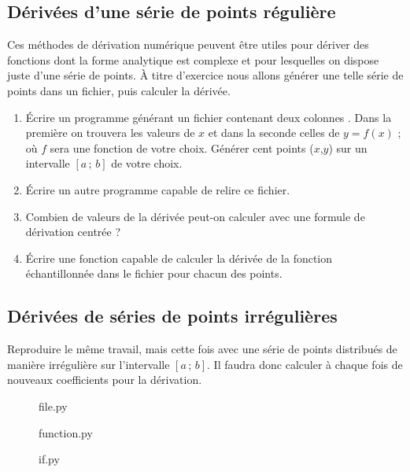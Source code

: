 \subsection{Dérivées d'une série de points régulière \sc{[Facultatif]}}

Ces méthodes de dérivation numérique  peuvent être utiles pour dériver
des fonctions dont la forme analytique est complexe et pour lesquelles
on dispose juste d'une série de points. À titre d'exercice nous allons
générer une  telle série de points  dans un fichier, puis  calculer la
dérivée.

\begin{enumerate}
\item Écrire un programme générant  un fichier contenant deux colonnes
  . Dans  la première  on trouvera les  valeurs de  $x$ et
  dans la seconde celles de $y=f(x)$ ; où $f$ sera une fonction de votre
  choix. Générer  cent points ($x$,$y$) sur un  intervalle $[a\,;\,b]$  de votre
  choix.
\item Écrire un autre programme capable de relire ce fichier.
\item  Combien de  valeurs de  la  dérivée peut-on  calculer avec  une
  formule de dérivation centrée ?
\item  Écrire  une fonction  capable  de  calculer  la dérivée  de  la
  fonction échantillonnée dans le fichier pour chacun des points.
\end{enumerate}

\subsection{Dérivées de séries de points irrégulières \sc{[Facultatif]}}

Reproduire le même  travail, mais cette fois avec une  série de points
distribués  de manière  irrégulière sur  l'intervalle $[a\,;\,b]$.  Il
faudra donc  calculer à chaque  fois de nouveaux coefficients  pour la
dérivation.

\begin{figure}
\caption{file.py}
\end{figure}

\begin{figure}
\caption{function.py}
\end{figure}

\begin{figure}
\caption{if.py}
\end{figure}

